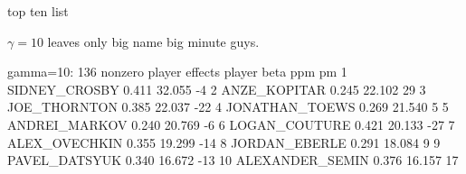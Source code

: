 \documentclass[11pt,xcolor=svgnames]{beamer}
\newcommand{\theme}{\color{Maroon}}
\newcommand{\nv}{\color{Navy}}
\begin{document}
\begin{frame}[fragile]{top ten list}

$\gamma=10$ leaves only big name big minute guys.

\begin{semiverbatim}\nv{}
 gamma=10: 136 nonzero player effects
             player  beta    ppm  pm
 1    SIDNEY_CROSBY 0.411 32.055  -4
 2     ANZE_KOPITAR 0.245 22.102  29
 3     JOE_THORNTON 0.385 22.037 -22
 4   JONATHAN_TOEWS 0.269 21.540   5
 5    ANDREI_MARKOV 0.240 20.769  -6
 6    LOGAN_COUTURE 0.421 20.133 -27
 7    ALEX_OVECHKIN 0.355 19.299 -14
 8    JORDAN_EBERLE 0.291 18.084   9
 9    PAVEL_DATSYUK 0.340 16.672 -13
 10 ALEXANDER_SEMIN 0.376 16.157  17
\end{semiverbatim}

\end{frame}

\end{document}
